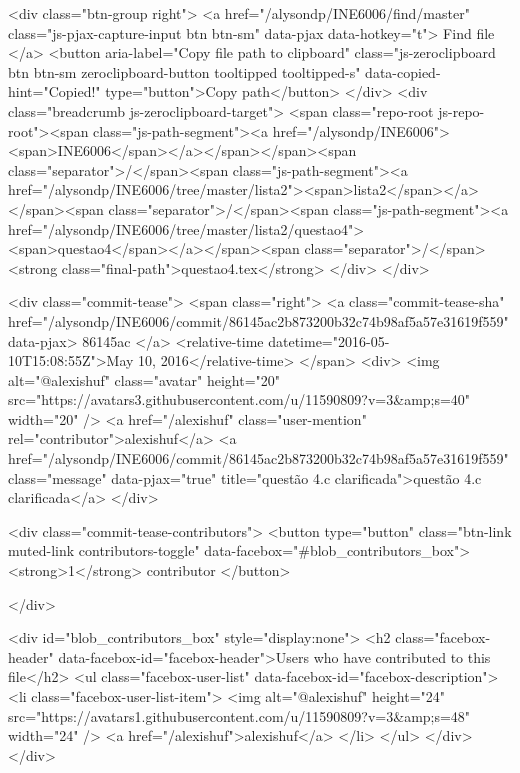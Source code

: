   <div class="btn-group right">
    <a href="/alysondp/INE6006/find/master"
          class="js-pjax-capture-input btn btn-sm"
          data-pjax
          data-hotkey="t">
      Find file
    </a>
    <button aria-label="Copy file path to clipboard" class="js-zeroclipboard btn btn-sm zeroclipboard-button tooltipped tooltipped-s" data-copied-hint="Copied!" type="button">Copy path</button>
  </div>
  <div class="breadcrumb js-zeroclipboard-target">
    <span class="repo-root js-repo-root"><span class="js-path-segment"><a href="/alysondp/INE6006"><span>INE6006</span></a></span></span><span class="separator">/</span><span class="js-path-segment"><a href="/alysondp/INE6006/tree/master/lista2"><span>lista2</span></a></span><span class="separator">/</span><span class="js-path-segment"><a href="/alysondp/INE6006/tree/master/lista2/questao4"><span>questao4</span></a></span><span class="separator">/</span><strong class="final-path">questao4.tex</strong>
  </div>
</div>


  <div class="commit-tease">
      <span class="right">
        <a class="commit-tease-sha" href="/alysondp/INE6006/commit/86145ac2b873200b32c74b98af5a57e31619f559" data-pjax>
          86145ac
        </a>
        <relative-time datetime="2016-05-10T15:08:55Z">May 10, 2016</relative-time>
      </span>
      <div>
        <img alt="@alexishuf" class="avatar" height="20" src="https://avatars3.githubusercontent.com/u/11590809?v=3&amp;s=40" width="20" />
        <a href="/alexishuf" class="user-mention" rel="contributor">alexishuf</a>
          <a href="/alysondp/INE6006/commit/86145ac2b873200b32c74b98af5a57e31619f559" class="message" data-pjax="true" title="questão 4.c clarificada">questão 4.c clarificada</a>
      </div>

    <div class="commit-tease-contributors">
      <button type="button" class="btn-link muted-link contributors-toggle" data-facebox="#blob_contributors_box">
        <strong>1</strong>
         contributor
      </button>
      
    </div>

    <div id="blob_contributors_box" style="display:none">
      <h2 class="facebox-header" data-facebox-id="facebox-header">Users who have contributed to this file</h2>
      <ul class="facebox-user-list" data-facebox-id="facebox-description">
          <li class="facebox-user-list-item">
            <img alt="@alexishuf" height="24" src="https://avatars1.githubusercontent.com/u/11590809?v=3&amp;s=48" width="24" />
            <a href="/alexishuf">alexishuf</a>
          </li>
      </ul>
    </div>
  </div>

